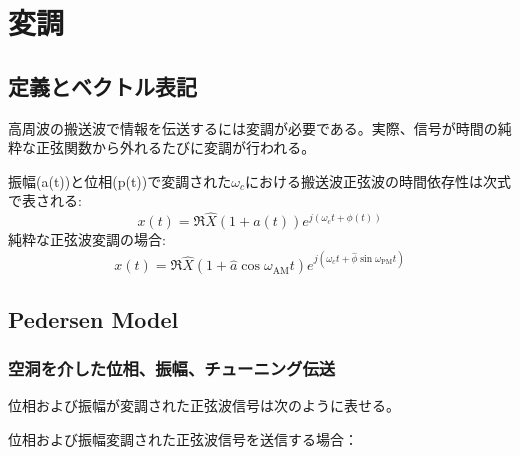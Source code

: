 \documentclass[book]{jlreq}
\begin{document}
\chapter{変調}
\section{定義とベクトル表記}
高周波の搬送波で情報を伝送するには変調が必要である。実際、信号が時間の純粋な正弦関数から外れるたびに変調が行われる。

振幅(a(t))と位相(p(t))で変調された$\omega_c$における搬送波正弦波の時間依存性は次式で表される:
%
\begin{equation}
    x(t) = \Re{\hat{X}(1+a(t))e^{j(\omega_c t + \phi(t))}}
\end{equation}
%
純粋な正弦波変調の場合:
%
\begin{equation}
    x(t) = \Re{\hat{X}(1 + \hat{a}\cos\omega_{\mathrm{AM}}t)e^{j(\omega_c t + \hat{\phi}\sin\omega_{\mathrm{PM}}t)}}
\end{equation}


\clearpage

\section{Pedersen Model}
\subsection{空洞を介した位相、振幅、チューニング伝送}

位相および振幅が変調された正弦波信号は次のように表せる。




位相および振幅変調された正弦波信号を送信する場合：
\end{document}
